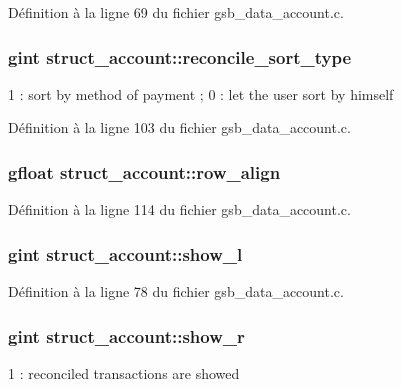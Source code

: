 Définition à la ligne 69 du fichier gsb\_\-data\_\-account.c.

\subsubsection[{reconcile\_\-sort\_\-type}]{\setlength{\rightskip}{0pt plus 5cm}gint {\bf struct\_\-account::reconcile\_\-sort\_\-type}}\label{structstruct__account_aa5463e31aba638d9b7ef8e739b9c830f}
1 : sort by method of payment ; 0 : let the user sort by himself 

Définition à la ligne 103 du fichier gsb\_\-data\_\-account.c.

\subsubsection[{row\_\-align}]{\setlength{\rightskip}{0pt plus 5cm}gfloat {\bf struct\_\-account::row\_\-align}}\label{structstruct__account_afe685c58192e1e16168624876f2d89b6}


Définition à la ligne 114 du fichier gsb\_\-data\_\-account.c.

\subsubsection[{show\_\-l}]{\setlength{\rightskip}{0pt plus 5cm}gint {\bf struct\_\-account::show\_\-l}}\label{structstruct__account_a47900d451bfdc969c5b5e90e45f2db28}


Définition à la ligne 78 du fichier gsb\_\-data\_\-account.c.

\subsubsection[{show\_\-r}]{\setlength{\rightskip}{0pt plus 5cm}gint {\bf struct\_\-account::show\_\-r}}\label{structstruct__account_a7ff6fe8109180c4c2dcc96553d3c90d4}
1 : reconciled transactions are showed 

